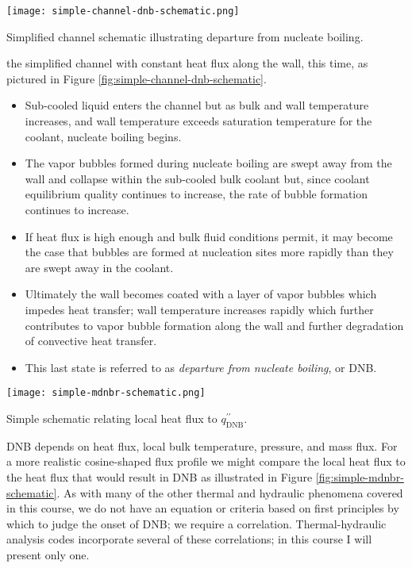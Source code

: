 \begin{marginfigure}
\texttt{[image: simple-channel-dnb-schematic.png]}
\caption{Simplified channel schematic illustrating departure from nucleate boiling.}
\label{fig:simple-channel-dnb-schematic}
\end{marginfigure}
 the simplified channel with constant heat flux along the wall, this time, as pictured in Figure \ref{fig:simple-channel-dnb-schematic}.
\begin{itemize}
\item Sub-cooled liquid enters the channel but as bulk and wall temperature increases, and wall temperature exceeds saturation temperature for the coolant, nucleate boiling begins.
\item The vapor bubbles formed during nucleate boiling are swept away from the wall and collapse within the sub-cooled bulk coolant but, since coolant equilibrium quality continues to increase, the rate of bubble formation continues to increase.
\item If heat flux is high enough and bulk fluid conditions permit, it may become the case that bubbles are formed at nucleation sites more rapidly than they are swept away in the coolant.
\item Ultimately the wall becomes coated with a layer of vapor bubbles which impedes heat transfer; wall temperature increases rapidly which further contributes to vapor bubble formation along the wall and further degradation of convective heat transfer.
\item This last state is referred to as \emph{departure from nucleate boiling}, or DNB.
\end{itemize}
\begin{marginfigure}
\texttt{[image: simple-mdnbr-schematic.png]}
\caption{Simple schematic relating local heat flux to $q^{\prime \prime}_{\text{DNB}}$.}
\label{fig:simple-mdnbr-schematic}
\end{marginfigure}
 DNB depends on heat flux, local bulk temperature, pressure, and mass flux.  For a more realistic cosine-shaped flux profile we might compare the local heat flux to the heat flux that would result in DNB as illustrated in Figure \ref{fig:simple-mdnbr-schematic}. As with many of the other thermal and hydraulic phenomena covered in this course, we do not have an equation or criteria based on first principles by which to judge the onset of DNB; we require a correlation.  Thermal-hydraulic analysis codes incorporate several of these correlations; in this course I will present only one.

